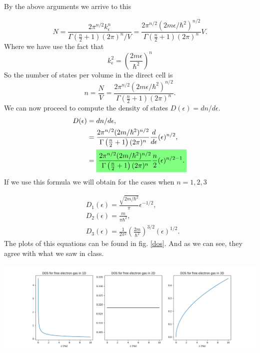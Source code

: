 \begin{questions}
\begin{solution}
   By the above arguments we arrive to this

   \begin{equation}
     N = \frac{2\pi^{n/2}k_\epsilon^n}{\Gamma\left(\frac{n}{2} + 1\right)(2\pi)^n/V} =  \frac{2\pi^{n/2}(2m\epsilon/\hbar^2)^{n/2}}{\Gamma\left(\frac{n}{2} + 1\right)(2\pi)^n}V.
     \label{N}
   \end{equation}
Where we have use the fact that
\begin{equation}
  k^2_\epsilon = \left(\frac{2m\epsilon}{\hbar^2}\right)^n
\end{equation}
So the number of states per volume in the direct cell is
\begin{equation}
  n = \frac{N}{V} =   \frac{2\pi^{n/2}(2m\epsilon/\hbar^2)^{n/2}}{\Gamma\left(\frac{n}{2} + 1\right)(2\pi)^n}.
  \label{N}
\end{equation}
We can now proceed to compute the density of states $D(\epsilon) = dn/d\epsilon$.
\begin{equation}
  \begin{aligned}[b]
    D(\epsilon) &= dn/d\epsilon,\\
    &= \frac{2\pi^{n/2}(2m/\hbar^2)^{n/2}}{\Gamma\left(\frac{n}{2} + 1\right)(2\pi)^n} \frac{d}{d\epsilon} (\epsilon)^{n/2},\\
    &= \hlgreen{\frac{2\pi^{n/2}(2m/\hbar^2)^{n/2}}{\Gamma\left(\frac{n}{2} + 1\right)(2\pi)^n} \frac{n}{2} (\epsilon)^{n/2 -1}.}
  \end{aligned}
\end{equation}
If we use this formula we will obtain for the cases when $n=1,2,3$

\begin{eqnarray}
  &D_1(\epsilon) = \frac{\sqrt{2m/\hbar^2}}{\pi}\epsilon^{-1/2},\\
  &D_2(\epsilon) = \frac{m}{\pi\hbar^2},\\
  &D_3(\epsilon) = \frac{1}{2\pi^2}\left(\frac{2m}{\hbar^2}\right)^{3/2}(\epsilon)^{1/2}.
\end{eqnarray}
The plots of this equations can be found in fig. \ref{dos}. And as we can see, they agree with what we saw in class.
\begin{center}
  \includegraphics[width=\linewidth]{Dos.png}
\end{center}
\label{dos}\vspace{0.5cm}


\end{solution}
\end{questions}
